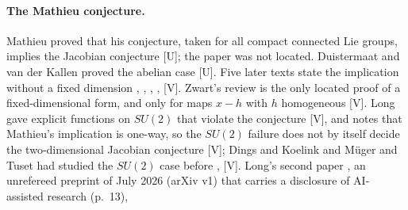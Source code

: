 \documentclass[11pt]{article}
\theoremstyle{remark}
\begin{document}
\paragraph{The Mathieu conjecture.} Mathieu proved that his conjecture, taken for all compact connected Lie groups, implies the Jacobian conjecture \cite{Mathieu1997} [U]; the paper was not located. Duistermaat and van der Kallen proved the abelian case \cite{DvdK1998} [U]. Five later texts state the implication without a fixed dimension \cite[p.~1]{vdEMathieu}, \cite[p.~1]{vdEWZ}, \cite[p.~1]{DingsKoelink}, \cite[p.~3]{Zhao2009}, \cite[p.~1]{MuegerTuset} [V]. Zwart's review is the only located proof of a fixed-dimensional form, and only for maps $x-h$ with $h$ homogeneous \cite[Theorems~4.16 and~4.23, pp.~39 and~43]{Zwart2025} [V]. Long gave explicit functions on $SU(2)$ that violate the conjecture \cite[Theorem~4.2, p.~6]{LongSU2} [V], and notes that Mathieu's implication is one-way, so the $SU(2)$ failure does not by itself decide the two-dimensional Jacobian conjecture \cite[Remark~4.3, p.~7]{LongSU2} [V]; Dings and Koelink and M\"uger and Tuset had studied the $SU(2)$ case before \cite[p.~1]{DingsKoelink}, \cite[p.~1]{MuegerTuset} [V]. Long's second paper \cite{LongMathieu2026}, an unrefereed preprint of July 2026 (arXiv v1) that carries a disclosure of AI-assisted research (p.~13), %
\end{document}

